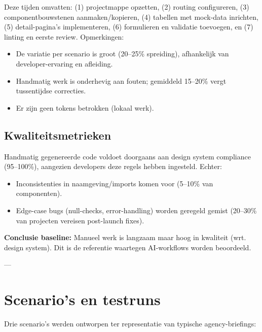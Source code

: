 Deze tijden omvatten: (1) projectmappe opzetten, (2) routing configureren, (3) componentbouwstenen aanmaken/kopieren, (4) tabellen met mock-data inrichten, (5) detail-pagina's implementeren, (6) formulieren en validatie toevoegen, en (7) linting en eerste review. Opmerkingen:

\begin{itemize}
  \item De variatie per scenario is groot (20--25\% spreiding), afhankelijk van developer-ervaring en afleiding.
  \item Handmatig werk is onderhevig aan fouten; gemiddeld 15--20\% vergt tussentijdse correcties.
  \item Er zijn geen tokens betrokken (lokaal werk).
\end{itemize}

\subsection{Kwaliteitsmetrieken}

Handmatig gegenereerde code voldoet doorgaans aan design system compliance (95--100\%), aangezien developers deze regels hebben ingesteld. Echter:

\begin{itemize}
  \item Inconsistenties in naamgeving/imports komen voor (5--10\% van componenten).
  \item Edge-case bugs (null-checks, error-handling) worden geregeld gemist (20--30\% van projecten vereisen post-launch fixes).
\end{itemize}

\noindent
\textbf{Conclusie baseline:} Manueel werk is langzaam maar hoog in kwaliteit (wrt. design system). Dit is de referentie waartegen AI-workflows worden beoordeeld.

---

\section{Scenario's en testruns}

Drie scenario's werden ontworpen ter representatie van typische agency-briefings:

